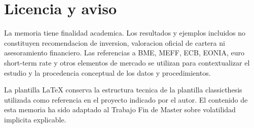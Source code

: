 \chapter*{Licencia y aviso}

La memoria tiene finalidad academica. Los resultados y ejemplos incluidos no constituyen recomendacion de inversion, valoracion oficial de cartera ni asesoramiento financiero. Las referencias a BME, MEFF, ECB, EONIA, euro short-term rate y otros elementos de mercado se utilizan para contextualizar el estudio y la procedencia conceptual de los datos y procedimientos.

La plantilla LaTeX conserva la estructura tecnica de la plantilla classicthesis utilizada como referencia en el proyecto indicado por el autor. El contenido de esta memoria ha sido adaptado al Trabajo Fin de Master sobre volatilidad implicita explicable.

